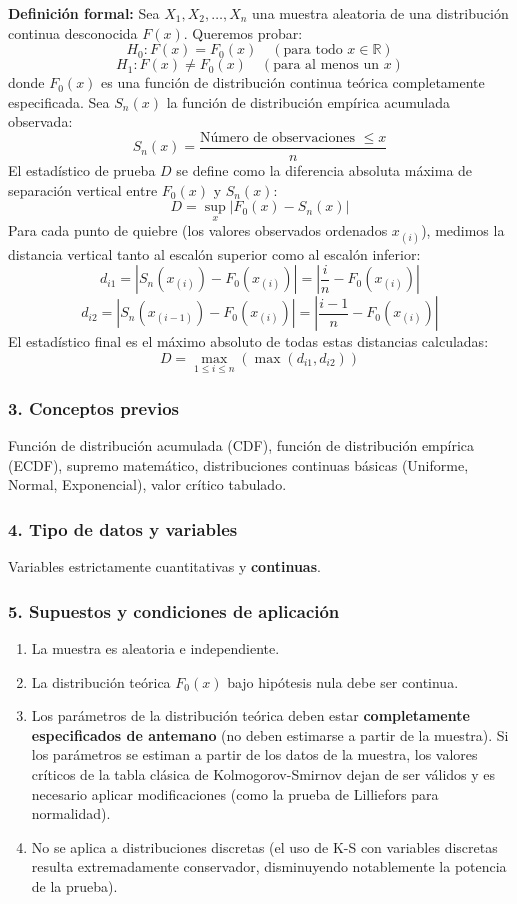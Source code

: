 \documentclass[11pt,a4paper]{article}
\begin{document}
\textbf{Definición formal:} Sea $X_1, X_2, \dots, X_n$ una muestra aleatoria de una distribución continua desconocida $F(x)$. Queremos probar:
\[ H_0: F(x) = F_0(x) \quad (\text{para todo } x \in \mathbb{R}) \]
\[ H_1: F(x) \neq F_0(x) \quad (\text{para al menos un } x) \]
donde $F_0(x)$ es una función de distribución continua teórica completamente especificada. Sea $S_n(x)$ la función de distribución empírica acumulada observada:
\[ S_n(x) = \frac{\text{Número de observaciones } \le x}{n} \]
El estadístico de prueba $D$ se define como la diferencia absoluta máxima de separación vertical entre $F_0(x)$ y $S_n(x)$:
\[ D = \sup_{x} \left| F_0(x) - S_n(x) \right| \]
Para cada punto de quiebre (los valores observados ordenados $x_{(i)}$), medimos la distancia vertical tanto al escalón superior como al escalón inferior:
\[ d_{i1} = \left| S_n(x_{(i)}) - F_0(x_{(i)}) \right| = \left| \frac{i}{n} - F_0(x_{(i)}) \right| \]
\[ d_{i2} = \left| S_n(x_{(i-1)}) - F_0(x_{(i)}) \right| = \left| \frac{i-1}{n} - F_0(x_{(i)}) \right| \]
El estadístico final es el máximo absoluto de todas estas distancias calculadas:
\[ D = \max_{1 \le i \le n} \left( \max(d_{i1}, d_{i2}) \right) \]

\subsubsection{3. Conceptos previos}
Función de distribución acumulada (CDF), función de distribución empírica (ECDF), supremo matemático, distribuciones continuas básicas (Uniforme, Normal, Exponencial), valor crítico tabulado.

\subsubsection{4. Tipo de datos y variables}
Variables estrictamente cuantitativas y \textbf{continuas}.

\subsubsection{5. Supuestos y condiciones de aplicación}
\begin{enumerate}
    \item La muestra es aleatoria e independiente.
    \item La distribución teórica $F_0(x)$ bajo hipótesis nula debe ser continua.
    \item Los parámetros de la distribución teórica deben estar \textbf{completamente especificados de antemano} (no deben estimarse a partir de la muestra). Si los parámetros se estiman a partir de los datos de la muestra, los valores críticos de la tabla clásica de Kolmogorov-Smirnov dejan de ser válidos y es necesario aplicar modificaciones (como la prueba de Lilliefors para normalidad).
    \item No se aplica a distribuciones discretas (el uso de K-S con variables discretas resulta extremadamente conservador, disminuyendo notablemente la potencia de la prueba).
\end{enumerate}
\end{document}
